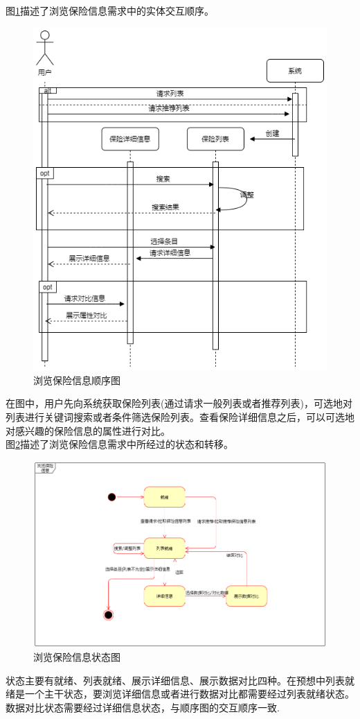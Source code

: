 \documentclass[a4paper]{ctexart}
\begin{document}
图\ref{fig:浏览保险信息顺序图}描述了浏览保险信息需求中的实体交互顺序。
\begin{figure}[H]
\centering
\includegraphics[scale=0.4]{image/2_3顺序图.png}
\caption{浏览保险信息顺序图}
\label{fig:浏览保险信息顺序图}
\end{figure}
在图中，用户先向系统获取保险列表(通过请求一般列表或者推荐列表)，可选地对列表进行关键词搜索或者条件筛选保险列表。查看保险详细信息之后，可以可选地对感兴趣的保险信息的属性进行对比。\\

图\ref{fig:浏览保险信息状态图}描述了浏览保险信息需求中所经过的状态和转移。
\begin{figure}[H]
\centering
\includegraphics[scale=0.4]{image/2_4状态图.png}
\caption{浏览保险信息状态图}
\label{fig:浏览保险信息状态图}
\end{figure}
状态主要有就绪、列表就绪、展示详细信息、展示数据对比四种。在预想中列表就绪是一个主干状态，要浏览详细信息或者进行数据对比都需要经过列表就绪状态。数据对比状态需要经过详细信息状态，与顺序图的交互顺序一致.
\end{document}
